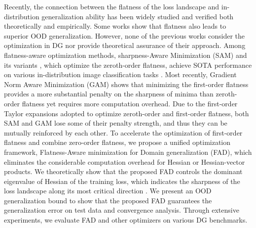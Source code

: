 Recently, the connection between the flatness of the loss landscape and in-distribution generalization ability has been widely studied and verified both theoretically\cite{zhuang2022surrogate} and empirically\cite{du2022sharpness}.  
Some works \cite{cha2021swad, rangwani2022closer} show that flatness also leads to superior OOD generalization. However, none of the previous works consider the optimization in DG nor provide theoretical assurance of their approach. 
Among flatness-aware optimization methods, sharpness-Aware Minimization (SAM) \cite{foret2021sharpness} and its variants \cite{zhuang2022surrogate, kwon2021asam,zhong2022improving,kim2022sharpness}, which optimize the zeroth-order flatness, achieve SOTA performance on various in-distribution image classification tasks \cite{kwon2021asam,zhuang2022surrogate}. Most recently, Gradient Norm Aware Minimization (GAM) \cite{Zhang2023GradientNA} shows that minimizing the first-order flatness provides a more substantial penalty on the sharpness of minima than zeroth-order flatness yet requires more computation overhead. 
Due to the first-order Taylor expansions adopted to optimize zeroth-order and first-order flatness, both SAM and GAM lose some of their penalty strength, and thus they can be mutually reinforced by each other. To accelerate the optimization of first-order flatness and combine zero-order flatness, we propose a unified optimization framework, Flatness-Aware minimization for Domain generalization (FAD), which eliminates the considerable computation overhead for Hessian or Hessian-vector products. 
We theoretically show that the proposed FAD controls the dominant eigenvalue of Hessian of the training loss, which indicates the sharpness of the loss landscape along its most critical direction \cite{kaur2022maximum}.
We present an OOD generalization bound to show that the proposed FAD guarantees the generalization error on test data and convergence analysis. Through extensive experiments, we evaluate FAD and other optimizers on various DG benchmarks. 




